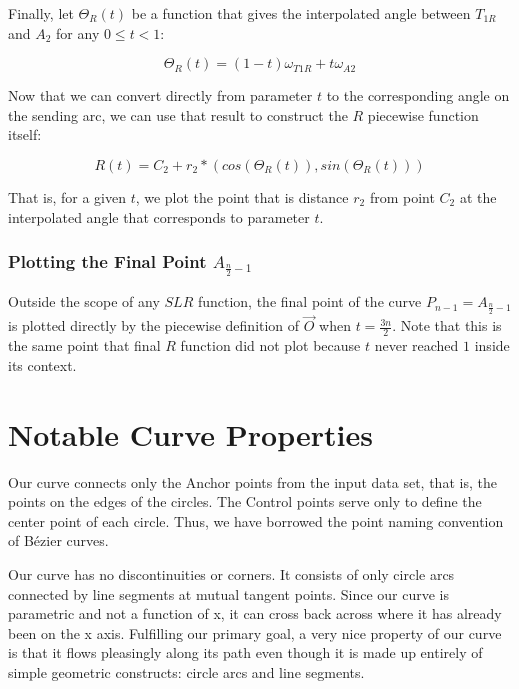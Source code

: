 \documentclass{article}
\begin{document}
Finally, let $\Theta_R(t)$ be a function that gives the interpolated angle between $T_{1R}$ and $A_2$ for any $0 \leq t < 1$:

\begin{equation}
    \label{eq:Theta_R(t)}
    \Theta_R(t) = (1-t) \omega_{T1R} + t \omega_{A2}
\end{equation}

Now that we can convert directly from parameter $t$ to the corresponding angle on the sending arc, we can use that result to construct the $R$ piecewise function itself:

\begin{equation}
    \label{eq:R(t)}
    R(t) = C_2 + r_2 * (cos( \Theta_R(t) ), sin( \Theta_R(t) ))
\end{equation}

That is, for a given $t$, we plot the point that is distance $r_2$ from point $C_2$ at the interpolated angle that corresponds to parameter $t$.


\subsubsection{Plotting the Final Point $A_{\frac{n}{2}-1}$}
Outside the scope of any $SLR$ function, the final point of the curve $P_{n-1} = A_{\frac{n}{2}-1}$ is plotted directly by the piecewise definition of $\overrightarrow{O}$ when $t = \frac{3n}{2}$. Note that this is the same point that final $R$ function did not plot because $t$ never reached $1$ inside its context.

\section{Notable Curve Properties}
Our curve connects only the Anchor points from the input data set, that is, the points on the edges of the circles. The Control points serve only to define the center point of each circle. Thus, we have borrowed the point naming convention  of B\'ezier curves.

Our curve has no discontinuities or corners. It consists of only circle arcs connected by line segments at mutual tangent points. Since our curve is parametric and not a function of x, it can cross back across where it has already been on the x axis. Fulfilling our primary goal, a very nice property of our curve is that it flows pleasingly along its path even though it is made up entirely of simple geometric constructs: circle arcs and line segments.
\end{document}
